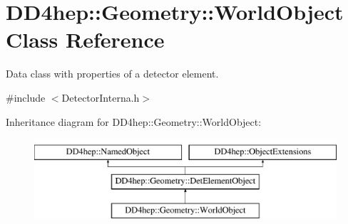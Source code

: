 \hypertarget{class_d_d4hep_1_1_geometry_1_1_world_object}{}\section{D\+D4hep\+:\+:Geometry\+:\+:World\+Object Class Reference}
\label{class_d_d4hep_1_1_geometry_1_1_world_object}


Data class with properties of a detector element.  




{\ttfamily \#include $<$Detector\+Interna.\+h$>$}

Inheritance diagram for D\+D4hep\+:\+:Geometry\+:\+:World\+Object\+:\begin{figure}[H]
\begin{center}
\leavevmode
\includegraphics[height=3.000000cm]{class_d_d4hep_1_1_geometry_1_1_world_object}
\end{center}
\end{figure}
